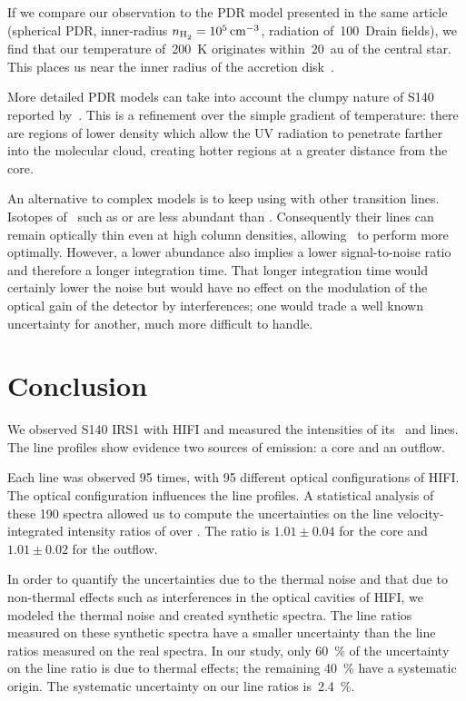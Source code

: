 If we compare our observation to the PDR model presented in the same article (spherical PDR, inner-radius $n_\text{\ce{H2}}=\SI{e5}{\per\centi\meter\cubed}$, radiation of~100~Drain fields), we find that our temperature of~\SI{200}{\kelvin} originates within~\SI{20}{\astronomicalunit} of the central star.
This places us near the inner radius of the accretion disk~\parencite{maud2013resolving}.

More detailed PDR models can take into account the clumpy nature of S140 reported by~\textcite{poelman2006line}.
This is a refinement over the simple gradient of temperature: there are regions of lower density which allow the UV radiation to penetrate farther into the molecular cloud, creating hotter regions at a greater distance from the core.

An alternative to complex models is to keep using \radex{} with other transition lines.
Isotopes of~ such as  or  are less abundant than .
Consequently their lines can remain optically thin even at high column densities, allowing~\radex{} to perform more optimally.
However, a lower abundance also implies a lower signal-to-noise ratio and therefore a longer integration time.
That longer integration time would certainly lower the noise but would have no effect on the modulation of the optical gain of the detector by interferences; one would trade a well known uncertainty for another, much more difficult to handle.


\FloatBarrier
\section{Conclusion}
We observed S140 IRS1 with HIFI and measured the intensities of its~ and  lines.
The line profiles show evidence two sources of emission:
a core and an outflow.

Each line was observed 95 times, with 95 different optical configurations of HIFI.
The optical configuration influences the line profiles.
A statistical analysis of these 190 spectra allowed us to compute the uncertainties on the line velocity-integrated intensity ratios of  over .
The ratio is $1.01 \pm 0.04$ for the core and $1.01 \pm 0.02$ for the outflow.

In order to quantify the uncertainties due to the thermal noise and that due to non-thermal effects such as interferences in the optical cavities of HIFI, we modeled the thermal noise and created synthetic spectra.
The line ratios measured on these synthetic spectra have a smaller uncertainty than the line ratios measured on the real spectra.
In our study, only \SI{60}{\percent} of the uncertainty on the line ratio is due to thermal effects; the remaining \SI{40}{\percent} have a systematic origin.
The systematic uncertainty on our line ratios is~\SI{2.4}{\percent}.

